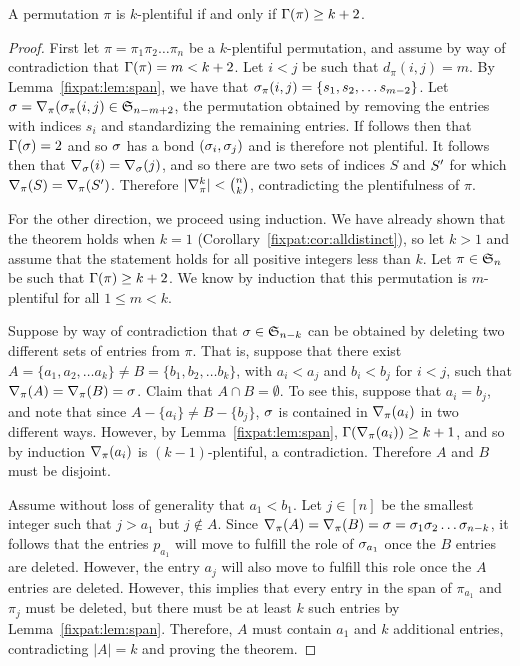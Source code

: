   \begin{theorem} \label{fixpat:thm:kplentiful}
    A permutation $\pi$ is $k$-plentiful if and only if $\Gam(\pi) \geq k+2$. 
  \end{theorem}
  \begin{proof}
    First let $\pi = \pi_1 \pi_2 \dots \pi_n$ be a $k$-plentiful permutation, and
    assume by way of contradiction that $\Gam(\pi) = m < k+2$. Let $i<j$ be
    such that $d_\pi(i,j) = m$. By Lemma~\ref{fixpat:lem:span}, we have that
    $\pspan_\pi(i,j) = \{s_1, s_2, \dots s_{m-2}\}$. Let $\sg =
    \delpi(\pspan_\pi(i,j) \in \S_{n-m+2}$, the permutation obtained by
    removing the entries with indices $s_i$ and standardizing the remaining
    entries. If follows then that $\Gam(\sg) = 2$ and so $\sg$ has a bond
    $(\sg_i, \sg_j)$ and is therefore not plentiful. It follows then that
    $\del_\sg(i) = \del_\sg(j)$, and so there are two sets of indices $S$ and
    $S\p$ for which $\del_\pi(S) = \del_\pi(S\p)$. Therefore $|\delpik| <
    \binom{n}{k}$, contradicting the plentifulness of $\pi$. 

    For the other direction, we proceed using induction.
    We have already shown that the theorem holds when $k=1$
    (Corollary~\ref{fixpat:cor:alldistinct}), so let $k>1$ and assume that the
    statement holds for all positive integers less than $k$.
    Let $\pi \in \S_n$ be such that $\Gam(\pi) \geq k+2$. We know by induction
    that this permutation is $m$-plentiful for all $1 \leq m < k$. 

    Suppose by way of contradiction that $\sg \in \S_{n - k}$ can be obtained
    by deleting two different sets of entries from $\pi$. That is, suppose that
    there exist $A = \{a_1, a_2, \dots a_k\} \neq B = \{b_1, b_2, \dots
    b_k\}$, with $a_i < a_j$ and $b_i < b_j$ for $i < j$, such that $\delpi(A)
    = \delpi(B) = \sg$. Claim that $A \cap B = \emptyset$. To see this, suppose
    that $a_i = b_j$, and note that since $A - \{a_i\} \neq B - \{b_j\}$, 
    $\sg$ is contained in $\delpi(a_i)$ in two different ways. However, by
    Lemma~\ref{fixpat:lem:span}, $\Gam(\delpi(a_i)) \geq k + 1$, and so by
    induction $\delpi(a_i)$ is $(k-1)$-plentiful, a contradiction. Therefore $A$ and
    $B$ must be disjoint. 

    Assume without loss of generality that $a_1 < b_1$. Let $j \in [n]$ be the
    smallest integer such that $j > a_1$ but $j \notin A$. Since $\delpi(A) =
    \delpi(B) = \sg = \sg_1 \sg_2 \dots \sg_{n-k}$, it follows that the
    entries $p_{a_1}$ will move to fulfill the role of $\sg_{a_1}$ once the $B$
    entries are deleted. However, the entry $a_j$ will also move to fulfill
    this role once the $A$ entries are deleted. However, this implies that
    every entry in the span of $\pi_{a_1}$ and $\pi_{j}$ must be deleted, but
    there must be at least $k$ such entries by Lemma~\ref{fixpat:lem:span}.
    Therefore, $A$ must contain $a_1$ and $k$ additional entries, contradicting
    $|A| = k$ and proving the theorem. 
  \end{proof}



